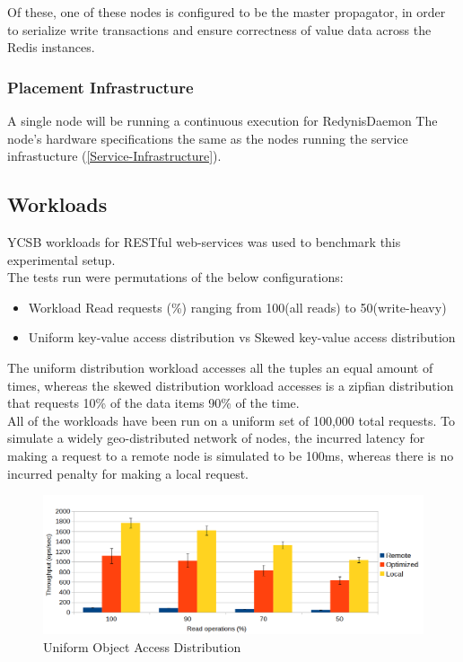 \documentclass{sig-alternate}
\begin{document}
Of these, one of these nodes is configured to be the master propagator, in order to serialize write transactions and ensure correctness of value data across the Redis instances.\\

\subsubsection{Placement Infrastructure}
A single node will be running a continuous execution for RedynisDaemon \cite{redynis-daemon}
The node's hardware specifications the same as the nodes running the service infrastucture (\ref{Service-Infrastructure}).\\

\subsection{Workloads}
YCSB workloads for RESTful web-services was used to benchmark this experimental setup.\\

The tests run were permutations of the below configurations:
\begin{itemize}
	\item  Workload Read requests (\%) ranging from 100(all reads) to 50(write-heavy)
	\item  Uniform key-value access distribution vs Skewed key-value access distribution
\end{itemize}

The uniform distribution workload accesses all the tuples an equal amount of times, whereas the skewed distribution workload accesses is a zipfian distribution that requests 10\% of the data items 90\% of the time.\\

All of the workloads have been run on a uniform set of 100,000 total requests. To simulate a widely geo-distributed network of nodes, the incurred latency for making a request to a remote node is simulated to be 100ms\cite{latency-stats}, whereas there is no incurred penalty for making a local request.\\


\begin{figure}[ht]
\centering
\includegraphics[width=\textwidth]{images/Uniform-dist-throughput.png}
\caption{Uniform Object Access Distribution}
\label{fig:res-unif}
\end{figure}
\end{document}
